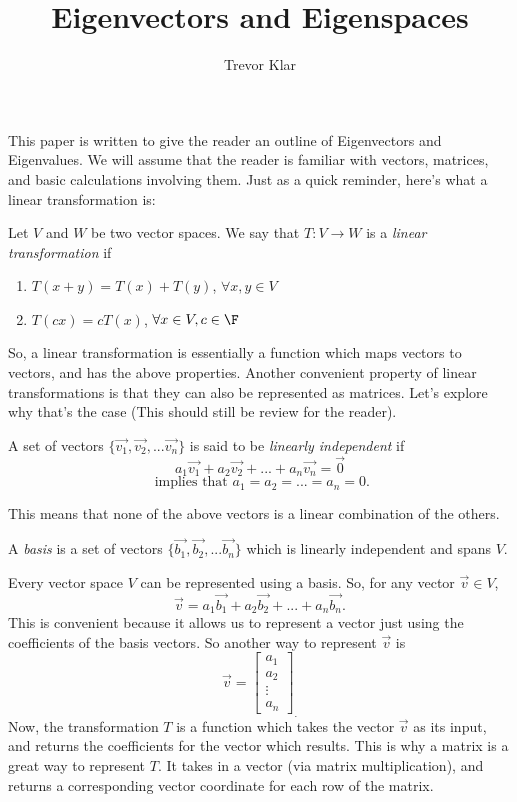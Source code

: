 \documentclass[letterpaper]{article}
\title{Eigenvectors and Eigenspaces}
\author{Trevor Klar}
\begin{document}
\maketitle

This paper is written to give the reader an outline of Eigenvectors and Eigenvalues. We will assume that the reader is familiar with vectors, matrices, and basic calculations involving them. Just as a quick reminder, here's what a linear transformation is:
\begin{definition}
Let $V$ and $W$ be two vector spaces. We say that $T: V \to W$ is a \emph{linear transformation} if 
\begin{enumerate}
\item $T(x+y) = T(x) + T(y)$, $\forall x,y \in V$
\item $T(cx) = cT(x)$, $\forall x \in V, c \in \F$
\end{enumerate}
\end{definition}

So, a linear transformation is essentially a function which maps vectors to vectors, and has the above properties. Another convenient property of linear transformations is that they can also be represented as matrices. Let's explore why that's the case (This should still be review for the reader). 

\begin{definition}
A set of vectors $\{\vec{v_1}, \vec{v_2}, ... \vec{v_n}\}$ is said to be \emph{linearly independent} if  $$a_1 \vec{v_1} + a_2 \vec{v_2} + ... + a_n \vec{v_n} = \vec{0}$$ $$\text{ implies that }a_1 = a_2 = ... = a_n = 0.$$
\end{definition}

This means that none of the above vectors is a linear combination of the others. 

\begin{definition}
 A \emph{basis} is a set of vectors $\{\vec{b_1}, \vec{b_2}, ... \vec{b_n}\}$ which is linearly independent and spans $V$. 
\end{definition}
Every vector space $V$ can be represented using a basis. So, for any vector $\vec{v} \in V$, 
$$\vec{v} = a_1\vec{b_1}+ a_2\vec{b_2}+ ... + a_n\vec{b_n}.$$
This is convenient because it allows us to represent a vector just using the coefficients of the basis vectors. So another way to represent $\vec{v}$ is 
\[
\vec{v}= 
\left[ \begin{array}{cc}
a_1 \\
a_2 \\ 
\vdots \\ 
a_n
\end{array} \right]_.
\]
Now, the transformation $T$ is a function which takes the vector $\vec{v}$ as its input, and returns the coefficients for the vector which results. This is why a matrix is a great way to represent $T$. It takes in a vector (via matrix multiplication), and returns a corresponding vector coordinate for each row of the matrix.
\end{document}
